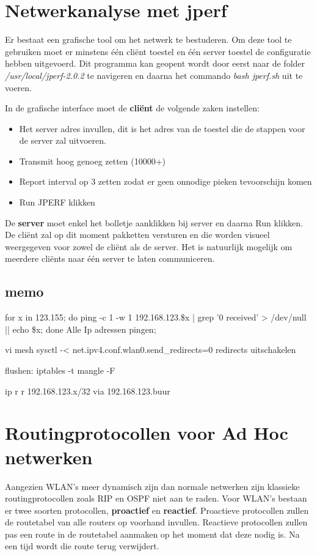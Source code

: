 \documentclass{report}
\begin{document}
\section{Netwerkanalyse met jperf}
Er bestaat een grafische tool om het netwerk te bestuderen. Om deze tool te gebruiken moet er minstens één cliënt toestel en één server toestel de configuratie hebben uitgevoerd. Dit programma kan geopent wordt door eerst naar de folder \textit{/usr/local/jperf-2.0.2} te navigeren en daarna het commando \textit{bash jperf.sh} uit te voeren.

In de grafische interface moet de \textbf{cliënt} de volgende zaken instellen:
\begin{itemize}
	\item Het server adres invullen, dit is het adres van de toestel die de stappen voor de server zal uitvoeren.
	\item Transmit hoog genoeg zetten (10000+)
	\item Report interval op 3 zetten zodat er geen onnodige pieken tevoorschijn komen
	\item Run JPERF klikken
\end{itemize}
De \textbf{server} moet enkel het bolletje aanklikken bij server en daarna Run klikken. De cliënt zal op dit moment pakketten versturen en die worden visueel weergegeven voor zowel de cliënt als de server. Het is natuurlijk mogelijk om meerdere cliënts naar één server te laten communiceren.

\subsection{memo}
for x in {123.155}; do ping -c 1 -w 1 192.168.123.\$x | grep '0 received' > /dev/null || echo \$x; done
Alle Ip adressen pingen;



vi mesh
	sysctl -< net.ipv4.conf.wlan0.send\_redirects=0
	redirects uitschakelen
	
flushen: iptables -t mangle -F

ip r r 192.168.123.x/32 via 192.168.123.buur

\section{Routingprotocollen voor Ad Hoc netwerken}
Aangezien WLAN's meer dynamisch zijn dan normale netwerken zijn klassieke routingprotocollen zoals RIP en OSPF niet aan te raden. Voor WLAN's bestaan er twee soorten protocollen, \textbf{proactief} en \textbf{reactief}. Proactieve protocollen zullen de routetabel van alle routers op voorhand invullen. Reactieve protocollen zullen pas een route in de routetabel aanmaken op het moment dat deze nodig is. Na een tijd wordt die route terug verwijdert.
\end{document}
